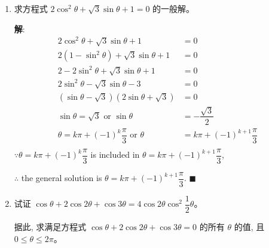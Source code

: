 \documentclass{report}
\newcommand{\sol}{\vspace{0.2cm}\textbf{解}:}
\begin{document}
\begin{enumerate}[leftmargin=*]
        \sol{}
        \begin{align*}
            \cos x+\cos 7 x &= \cos 4 x\\
            2\cos 4x\cos 3x &= \cos 4x\\
            \cos 4x(2\cos 3x - 1) &= 0\\
            \cos 4x = 0 \text{ or } 2\cos 3x - 1 &= 0\\
            4x = 2k\pi \pm \dfrac{\pi}{2} \text{ or } 3x = 2k\pi \pm \dfrac{\pi}{3}\\
            x = \dfrac{k\pi}{2} \pm \dfrac{\pi}{8} \text{ or } x &= \dfrac{2k\pi}{3} \pm \dfrac{\pi}{9} \quad \text{where } k \in \mathbb{Z} & \blacksquare
        \end{align*}
        
        \item 求方程式 $2 \cos ^2 \theta+\sqrt{3} \sin \theta+1=0$ 的一般解。
        
        \sol{}
        \begin{align*}
            2 \cos ^2 \theta+\sqrt{3} \sin \theta+1 &= 0\\
            2(1 - \sin^2\theta) + \sqrt{3}\sin\theta + 1 &= 0\\
            2 - 2\sin^2\theta + \sqrt{3}\sin\theta + 1 &= 0\\
            2\sin^2\theta - \sqrt{3}\sin\theta - 3 &= 0\\
            (\sin\theta - \sqrt{3})(2\sin\theta + \sqrt{3}) &= 0\\
            \sin\theta = \sqrt{3} \text{ or } \sin\theta &= -\dfrac{\sqrt{3}}{2}\\
            \theta = k\pi + (-1)^k\dfrac{\pi}{3} \text{ or } \theta &= k\pi + (-1)^{k+1}\dfrac{\pi}{3}\\
        \end{align*}
        $\because \theta = k\pi + (-1)^k\dfrac{\pi}{3}$ is included in $\theta = k\pi + (-1)^{k+1}\dfrac{\pi}{3}$,

        $\therefore$ the general solution is $\theta = k\pi + (-1)^{k+1}\dfrac{\pi}{3}$. \hfill $\blacksquare$
        
        \newpage
        \item 试证 $\cos \theta+2 \cos 2 \theta+\cos 3 \theta=4 \cos 2 \theta \cos ^2 \dfrac{1}{2} \theta$。

        据此, 求满足方程式 $\cos \theta+2 \cos 2 \theta+\cos 3 \theta=0$ 的所有 $\theta$ 的值, 且 $0 \leq \theta \leq 2 \pi$。


\end{enumerate}
\end{document}
